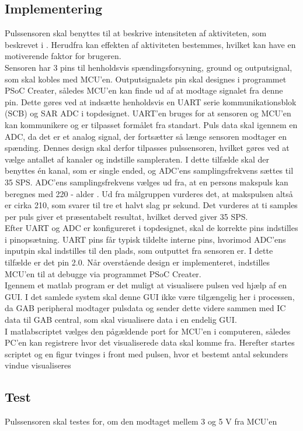 \subsection{Implementering}
Pulssensoren skal benyttes til at beskrive intensiteten af aktiviteten, som beskrevet i . Herudfra kan effekten af aktiviteten bestemmes, hvilket kan have en motiverende faktor for brugeren. \\
Sensoren har 3 pins til henholdsvis spændingsforsyning, ground og outputsignal, som skal kobles med MCU'en. Outputsignalets pin skal designes i programmet PSoC Creater, således MCU'en kan finde ud af at modtage signalet fra denne pin. Dette gøres ved at indsætte henholdsvis en UART serie kommunikationsblok (SCB) og SAR ADC i topdesignet. UART'en bruges for at sensoren og MCU'en kan kommunikere og er tilpasset formålet fra standart. Puls data skal igennem en ADC, da det er et analog signal, der fortsætter så længe sensoren modtager en spænding. Dennes design skal derfor tilpasses pulssensoren, hvilket gøres ved at vælge antallet af kanaler og indstille sampleraten. I dette tilfælde skal der benyttes én kanal, som er single ended, og ADC'ens samplingsfrekvens sættes til 35 SPS. ADC'ens samplingsfrekvens vælges ud fra, at en persons makspuls kan beregnes med 220 - alder \citep{CooperBlair2005}. Ud fra målgruppen vurderes det, at makspulsen altså er cirka 210, som svarer til tre et halvt slag pr sekund. Det vurderes at ti samples per puls giver et præsentabelt resultat, hvilket derved giver 35 SPS.\\
Efter UART og ADC er konfigureret i topdesignet, skal de korrekte pins indstilles i pinopsætning. UART pins får typisk tildelte interne pins, hvorimod ADC'ens inputpin skal indstilles til den plads, som outputtet fra sensoren er. I dette tilfælde er det pin 2.0. Når overstående design er implementeret, indstilles MCU'en til at debugge via programmet PSoC Creater. \\

Igennem et matlab program er det muligt at visualisere pulsen ved hjælp af en GUI. I det samlede system skal denne GUI ikke være tilgængelig her i processen, da GAB peripheral modtager pulsdata og sender dette videre sammen med IC data til GAB central, som skal visualisere data i en endelig GUI.\\
I matlabscriptet vælges den pågældende port for MCU'en i computeren, således PC'en kan registrere hvor det visualiserede data skal komme fra. Herefter startes scriptet og en figur tvinges i front med pulsen, hvor et bestemt antal sekunders vindue visualiseres
\subsection{Test}
Pulssensoren skal testes for, om den modtaget mellem 3 og 5 V fra MCU'en


